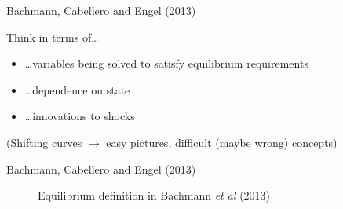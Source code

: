 

\begin{frame}{Bachmann, Cabellero and Engel (2013)}

Think in terms of\ldots
\begin{itemize}
\item	\ldots variables being solved to satisfy equilibrium requirements
\item	\ldots dependence on state
\item	\ldots innovations to shocks
\end{itemize}

\vspace{3mm}
(Shifting curves $\rightarrow$ easy pictures, difficult (maybe wrong) concepts)

\end{frame}



\begin{frame}{Bachmann, Cabellero and Engel (2013)}

\begin{figure}[!htb]
\caption[Equilibrium in Bachmann \textit{et al} (2013)]{\label{fig:bachman_et_al_equilibrium_definition_snip} Equilibrium definition in Bachmann \textit{et al} (2013)}
\end{figure}

\hyperlink{curveshift}{}


\end{frame}